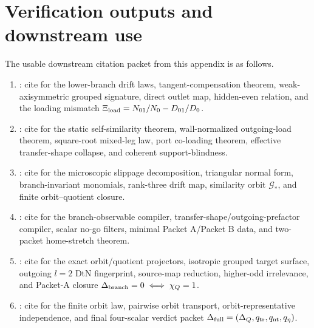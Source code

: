 
\section{Verification outputs and downstream use}
\label{sec:app-part05-verification-outputs}

The usable downstream citation packet from this appendix is as follows.
\begin{enumerate}[leftmargin=2.2em]
\item {}: cite for the lower-branch drift laws, tangent-compensation theorem, weak-axisymmetric grouped signature, direct outlet map, hidden-even relation, and the loading mismatch \(\Xi_{\rm load}=N_{01}/N_0-D_{01}/D_0\).
\item {}: cite for the static self-similarity theorem, wall-normalized outgoing-load theorem, square-root mixed-leg law, port co-loading theorem, effective transfer-shape collapse, and coherent support-blindness.
\item {}: cite for the microscopic slippage decomposition, triangular normal form, branch-invariant monomials, rank-three drift map, similarity orbit \(\mathcal G_*\), and finite orbit--quotient closure.
\item {}: cite for the branch-observable compiler, transfer-shape/outgoing-prefactor compiler, scalar no-go filters, minimal Packet A/Packet B data, and two-packet home-stretch theorem.
\item {}: cite for the exact orbit/quotient projectors, isotropic grouped target surface, outgoing \(l=2\) DtN fingerprint, source-map reduction, higher-odd irrelevance, and Packet-A closure \(\Delta_{\rm branch}=0\iff\chi_Q=1\).
\item {}: cite for the finite orbit law, pairwise orbit transport, orbit-representative independence, and final four-scalar verdict packet \(\Delta_{\rm full}=(\Delta_Q,q_{\rm tr},q_{\rm nt},q_\eta)\).
\end{enumerate}

